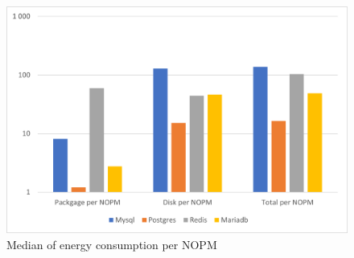 \begin{figure}[h]
\centering
    \includegraphics[width=0.8\columnwidth]{results/median/10m/energy-nopm.png}
\caption{Median of energy consumption per NOPM}
\label{fig:mediannopmenergy10m}\end{figure}

